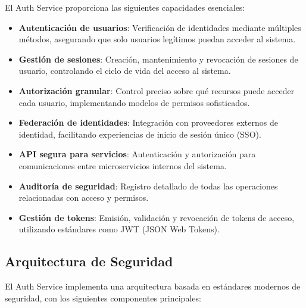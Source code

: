 \documentclass[12pt,a4paper]{article}
\begin{document}
El Auth Service proporciona las siguientes capacidades esenciales:

\begin{itemize}
    \item \textbf{Autenticación de usuarios}: Verificación de identidades mediante múltiples métodos, asegurando que solo usuarios legítimos puedan acceder al sistema.
    
    \item \textbf{Gestión de sesiones}: Creación, mantenimiento y revocación de sesiones de usuario, controlando el ciclo de vida del acceso al sistema.
    
    \item \textbf{Autorización granular}: Control preciso sobre qué recursos puede acceder cada usuario, implementando modelos de permisos sofisticados.
    
    \item \textbf{Federación de identidades}: Integración con proveedores externos de identidad, facilitando experiencias de inicio de sesión único (SSO).
    
    \item \textbf{API segura para servicios}: Autenticación y autorización para comunicaciones entre microservicios internos del sistema.
    
    \item \textbf{Auditoría de seguridad}: Registro detallado de todas las operaciones relacionadas con acceso y permisos.
    
    \item \textbf{Gestión de tokens}: Emisión, validación y revocación de tokens de acceso, utilizando estándares como JWT (JSON Web Tokens).
\end{itemize}

\subsection{Arquitectura de Seguridad}
\label{subsec:as-arquitectura}

El Auth Service implementa una arquitectura basada en estándares modernos de seguridad, con los siguientes componentes principales:
\end{document}
